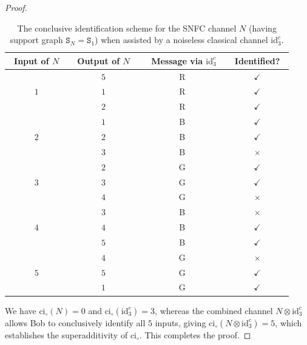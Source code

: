 \documentclass[10pt,a4paper]{amsart}
\begin{document}
\begin{proof}
\begin{table}[t]
\centering
\begin{tabular}{c|c|c|c}
\hline
~Input of $N$~ & ~Output of $N$~ &~ Message via $\mathrm{id}^c_3$~ & ~Identified?~ \\
\hline\hline
\multirow{3}{*}{$1$} 
& $5$ & R & $\checkmark$ \\
& $1$ & R & $\checkmark$ \\
& $2$ & R & $\checkmark$ \\
\hline
\multirow{3}{*}{$2$} 
& $1$ & B & $\checkmark$ \\
& $2$ & B & $\checkmark$ \\
& $3$ & B & $\times$ \\
\hline
\multirow{3}{*}{$3$} 
& $2$ & G & $\checkmark$ \\
& $3$ & G & $\checkmark$ \\
& $4$ & G & $\times$ \\
\hline
\multirow{3}{*}{$4$} 
& $3$ & B & $\times$ \\
& $4$ & B & $\checkmark$ \\
& $5$ & B & $\checkmark$ \\
\hline
\multirow{3}{*}{$5$} 
& $4$ & G & $\times$ \\
& $5$ & G & $\checkmark$ \\
& $1$ & G & $\checkmark$ \\
\hline
\end{tabular}
\caption{The conclusive identification scheme for the SNFC channel $N$ (having support graph $\mathtt{S}_{N}=\mathtt{S}_1$) when assisted by a noiseless classical channel $\mathrm{id}^c_3$. }
\label{tab1}
\end{table}
\noindent We have $\mathrm{ci}_\circ(N) = 0$ and $\mathrm{ci}_\circ(\mathrm{id}^c_3) = 3$, whereas the combined channel $N \otimes \mathrm{id}^c_3$ allows Bob to conclusively identify all $5$ inputs, giving $\mathrm{ci}_\circ(N \otimes \mathrm{id}^c_3) = 5$, 
which establishes the superadditivity of $\mathrm{ci}_\circ$. This completes the proof. 
\end{proof}
\end{document}
